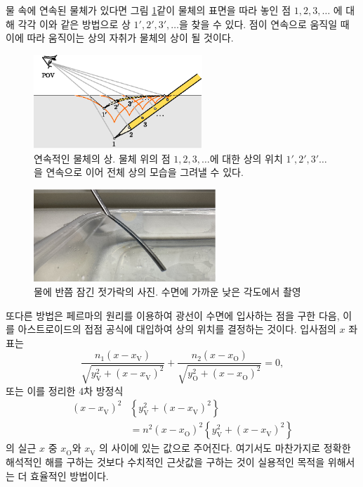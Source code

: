 \documentclass[twocolumn]{article}
\begin{document}
물 속에 연속된 물체가 있다면 그림 \ref{fig:extended_image}\와 같이 물체의 표면을 따라 놓인 점 $1, 2, 3, \dots$ 에 대해
각각 이와 같은 방법으로 상 $1', 2', 3', \dots$을 찾을 수 있다. 점이 연속으로 움직일 때 이에 따라 움직이는 상의 자취가 
물체의 상이 될 것이다.

\begin{figure}[h]
	\centering
	\includegraphics*[width=2.5in]{figs/g242.eps}
	\caption{연속적인 물체의 상. 물체 위의 점 $1, 2, 3, \dots$에 대한 상의 위치 $1', 2', 3' \dots$을 연속으로 이어 전체 상의 모습을 그려낼 수 있다.}
	\label{fig:extended_image}
\end{figure}

\begin{figure}[h]
	\centering
	\includegraphics[width=2.7in]{figs/img_1805_2.eps}
	\caption{물에 반쯤 잠긴 젓가락의 사진. 수면에 가까운 낮은 각도에서 촬영}
	\label{fig:picture}
\end{figure}


또다른 방법은 페르마의 원리를 이용하여 광선이 수면에 입사하는 점을 구한 다음, 이를 아스트로이드의 접점 공식에 대입하여 상의 위치를 결정하는 것이다.
입사점의 $x$ 좌표는
\[
\dfrac{n_1 \left( x - x_{\mathrm{V}}^{} \right)}{\sqrt{ y_{\mathrm{V}}^2 + \left( x - x_{\mathrm{V}}^{} \right)^2 }}
+\dfrac{n_2 \left( x - x_{\mathrm{O}}^{} \right)}{\sqrt{ y_{\mathrm{O}}^2 + \left( x - x_{\mathrm{O}}^{} \right)^2 }}
= 0,
\]
또는 이를 정리한 4차 방정식
\[ \begin{aligned}
\left( x - x_{\mathrm{V}}^{} \right)^2 & \left\{ y_{\mathrm{V}}^2 + \left(x - x_{\mathrm{V}}^{} \right)^2 \right\}\\
&= n^2 \left( x - x_{\mathrm{O}}^{} \right)^2 \left\{ y_{\mathrm{V}}^2 + \left(x - x_{\mathrm{V}}^{} \right)^2 \right\}
\end{aligned}
\]
의 실근 $x$ 중 $x_{\mathrm{O}}^{}$와 $x_{\mathrm{V}}^{}$ 의 사이에 있는 값으로 주어진다. 여기서도 마찬가지로 정확한 해석적인 해를 구하는 것보다 수치적인 근삿값을 구하는 것이 실용적인 목적을 위해서는 더 효율적인 방법이다.
\end{document}
